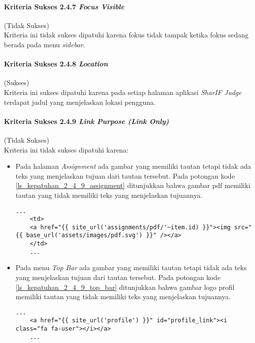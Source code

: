 \paragraph{Kriteria Sukses 2.4.7 \textit{Focus Visible}}
\label{subsubsec:kepatuhan_kriteria_2.4.7}
(Tidak Sukses) \\

Kriteria ini tidak sukses dipatuhi karena fokus tidak tampak ketika fokus sedang berada pada menu \textit{sidebar}.

\paragraph{Kriteria Sukses 2.4.8 \textit{Location}}
\label{subsubsec:kepatuhan_kriteria_2.4.8}
(Sukses) \\

Kriteria ini sukses dipatuhi karena pada setiap halaman aplikasi \textit{SharIF Judge} terdapat judul yang menjelaskan lokasi pengguna.

\paragraph{Kriteria Sukses 2.4.9 \textit{Link Purpose (Link Only)}}
\label{subsubsec:kepatuhan_kriteria_2.4.9}
(Tidak Sukses) \\

Kriteria ini tidak sukses dipatuhi karena:
\begin{itemize}
	\item Pada halaman \textit{Assignment} ada gambar yang memiliki tautan tetapi tidak ada teks yang menjelaskan tujuan dari tautan tersebut. Pada potongan kode \ref{ls_kepatuhan_2_4_9_assignment} ditunjukkan bahwa gambar pdf memiliki tautan yang tidak memiliki teks yang menjelaskan tujuannya.
	\begin{lstlisting}[basicstyle=\ttfamily, frame=single,
	columns=fullflexible, keepspaces=true, breaklines=true, label=ls_kepatuhan_2_4_9_assignment, caption=Pelanggaran Kriteria Sukses 2.4.9 - Gambar PDF Tidak Diberi Teks Alternatif]
	...
	<td>
	<a href="{{ site_url('assignments/pdf/'~item.id) }}"><img src="{{ base_url('assets/images/pdf.svg') }}" /></a>
	</td>
	...
	\end{lstlisting}
	
	\item Pada menu \textit{Top Bar} ada gambar yang memiliki tautan tetapi tidak ada teks yang menjelaskan tujuan dari tautan tersebut. Pada potongan kode \ref{ls_kepatuhan_2_4_9_top_bar} ditunjukkan bahwa gambar logo profil memiliki tautan yang tidak memiliki teks yang menjelaskan tujuannya.
	\begin{lstlisting}[basicstyle=\ttfamily, frame=single,
	columns=fullflexible, keepspaces=true, breaklines=true, label=ls_kepatuhan_2_4_9_top_bar, caption=Pelanggaran Kriteria Sukses 2.4.9 - Gambar Logo \textit{Profile} Tidak Diberi Teks Alternatif]
	...
	<a href="{{ site_url('profile') }}" id="profile_link"><i class="fa fa-user"></i></a>
	...
	\end{lstlisting}
	
\end{itemize}

